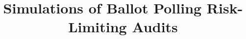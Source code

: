 \documentclass[runningheads]{llncs}
\begin{document}
\lstset{language=Python}
%
\title{Simulations of Ballot Polling Risk-Limiting Audits}
%
%
\begin{comment}
\author{Oliver Broadrick\inst{1} \and
Sarah Morin\inst{1} \and
Grant McClearn\inst{2} \and Neal McBurnett \and Poorvi L. Vora\inst{1} \and
Filip Zag{\'o}rski\inst{3} }
%
\authorrunning{Broadrick, Morin et al.}
%
\institute{Department of Computer Science, The George Washington University 
\email{obroadrick@gwmail.gwu.edu}\\
\and
Department of Computer Science, Stanford University 
\email{grantmcc@stanford.edu}\\
\and Wroclaw University of Science and Technology\\
\email{filip.zagorski@gmail.com}}
%
\end{comment}
\maketitle              %
%
\end{document}
